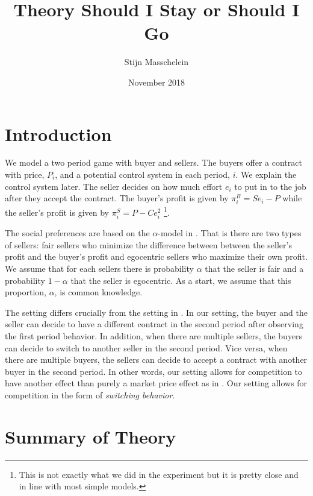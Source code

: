 \documentclass{article}
\title{Theory Should I Stay or Should I Go}
\author{Stijn Masschelein}
\date{November 2018}
\begin{document}
\maketitle

\section{Introduction}

We model a two period game with buyer and sellers. The buyers offer a contract with price, $P_i$, and a potential control system in each period, $i$. We explain the control system later. The seller decides on how much effort $e_i$ to put in to the job after they accept the contract. The buyer's profit is given by $\pi^B_{i} = Se_i - P$ while the seller's profit is given by $\pi^S_{i} = P - C e_i^2$ \footnote{This is not exactly what we did in the experiment but it is pretty close and in line with most simple models.}.

The social preferences are based on the $\alpha$-model in \citep{Bolton2008a}. That is there are two types of sellers: fair sellers who minimize the difference between between the seller's profit and the buyer's profit and egocentric sellers who maximize their own profit. We assume that for each sellers there is probability $\alpha$ that the seller is fair and a probability $1-\alpha$ that the seller is egocentric. As a start, we assume that this proportion, $\alpha$, is common knowledge.

The setting differs crucially from the setting in \citep{Choi2014}. In our setting, the buyer and the seller can decide to have a different contract in the second period after observing the first period behavior. In addition, when there are multiple sellers, the buyers can decide to switch to another seller in the second period. Vice versa, when there are multiple buyers, the sellers can decide to accept a contract with another buyer in the second period. In other words, our setting allows for competition to have another effect than purely a market price effect as in  \citep{Choi2014}. Our setting allows for competition in the form of \emph{switching behavior}.

\section{Summary of Theory}
\end{document}
